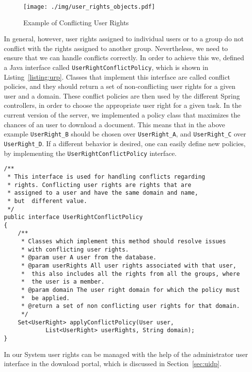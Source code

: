 \begin{figure}[ht]
	\begin{center}
		\texttt{[image: ./img/user\_rights\_objects.pdf]}
		\caption{Example of Conflicting User Rights}
		\label{fig:urconflict}
	\end{center}
\end{figure}

In general, however, user rights assigned to individual users or to a group do not conflict with the rights assigned to 
another group. Nevertheless, we need to ensure that we can handle conflicts correctly. In order to achieve this we, 
defined a Java interface called \verb=UserRightConflictPolicy=, which is shown in Listing~\ref{listing:urp}. Classes
that implement this interface are called conflict policies, and they should return a set of non-conflicting user rights 
for a given user and a domain. These conflict policies
are then used by the different Spring controllers, in order to choose the appropriate user right for a given task. In
the current version of the server, we implemented a policy class that maximizes the chances of an user to
download a document. This means that in the above example \verb=UserRight_B= should be chosen over \verb=UserRight_A=, and
\verb=UserRight_C= over \verb=UserRight_D=. If a different behavior is desired, one can easily define new policies,
by implementing the \verb=UserRightConflictPolicy= interface.

\begin{lstlisting}[caption={Java Interface UserRightConflictPolicy}, label={listing:urp}]
/**
 * This interface is used for handling conflicts regarding 
 * rights. Conflicting user rights are rights that are 
 * assigned to a user and have the same domain and name, 
 * but  different value. 
 */
public interface UserRightConflictPolicy 
{
	/**
	 * Classes which implement this method should resolve issues
	 * with conflicting user rights. 
	 * @param user A user from the database. 
	 * @param userRights All user rights associated with that user,
	 * 	this also includes all the rights from all the groups, where 
	 * 	the user is a member.  
	 * @param domain The user right domain for which the policy must
	 * 	be applied.  
	 * @return a set of non conflicting user rights for that domain. 
	 */
	Set<UserRight> applyConflictPolicy(User user, 
			List<UserRight> userRights, String domain);
}
\end{lstlisting}

In our System user rights can be managed with the help of the 
administrator user interface in the download portal, which is discussed in Section~\ref{sec:uidp}.

